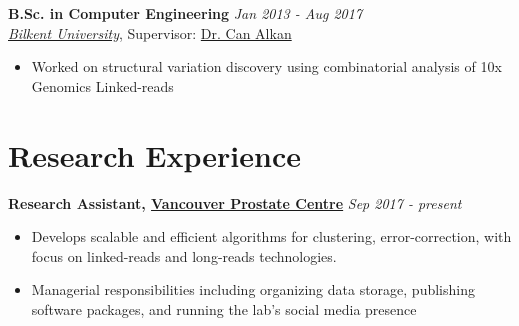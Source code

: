 \documentclass[margin]{res}
\begin{document}
\begin{resume}
    
    	\textbf{B.Sc. in Computer Engineering}  \hfill \textit{Jan 2013 - Aug 2017} \\
    	\href{http://cs.bilkent.edu.tr/}{\textit{Bilkent University}},
    	Supervisor: \href{http://www.cs.bilkent.edu.tr/~calkan/}{Dr. Can Alkan}\\
    	\vspace{-1em}
        \begin{itemize}[leftmargin=*]
    	    \item Worked on structural variation discovery using combinatorial analysis of 10x Genomics Linked-reads
    	\end{itemize}

    	

	\section{Research Experience}
        \textbf{Research Assistant, \href{http://www.prostatecentre.com/about-us/people/dr-faraz-hach}{{Vancouver Prostate Centre}}}  \hfill \textit{Sep 2017 - present} \\
    	\vspace{-1em}
        \begin{itemize}[leftmargin=*]
    	    \item Develops scalable and efficient algorithms for clustering, error-correction, with focus on linked-reads and long-reads technologies.
    	    \item Managerial responsibilities including organizing data storage, publishing software packages, and running the lab's social media presence
    	\end{itemize}


\end{resume}
\end{document}
